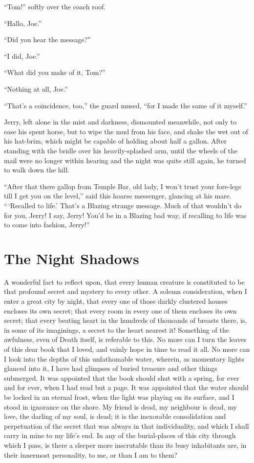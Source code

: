 ``Tom!'' softly over the coach roof.

``Hallo, Joe.''

``Did you hear the message?''

``I did, Joe.''

``What did you make of it, Tom?''

``Nothing at all, Joe.''

``That's a coincidence, too,'' the guard mused, ``for I made the
same of it myself.''

Jerry, left alone in the mist and darkness, dismounted meanwhile,
not only to ease his spent horse, but to wipe the mud from his
face, and shake the wet out of his hat-brim, which might be
capable of holding about half a gallon.  After standing with the
bridle over his heavily-splashed arm, until the wheels of the
mail were no longer within hearing and the night was quite still
again, he turned to walk down the hill.

``After that there gallop from Temple Bar, old lady, I won't trust
your fore-legs till I get you on the level,'' said this hoarse
messenger, glancing at his mare.  ``\,`Recalled to life.' That's a
Blazing strange message.  Much of that wouldn't do for you, Jerry!
I say, Jerry!  You'd be in a Blazing bad way, if recalling to life was
to come into fashion, Jerry!''



\chapter{The Night Shadows}


A wonderful fact to reflect upon, that every human creature is
constituted to be that profound secret and mystery to every other.
A solemn consideration, when I enter a great city by night, that
every one of those darkly clustered houses encloses its own secret;
that every room in every one of them encloses its own secret; that
every beating heart in the hundreds of thousands of breasts there,
is, in some of its imaginings, a secret to the heart nearest it!
Something of the awfulness, even of Death itself, is referable to
this.  No more can I turn the leaves of this dear book that I loved,
and vainly hope in time to read it all.  No more can I look into the
depths of this unfathomable water, wherein, as momentary lights
glanced into it, I have had glimpses of buried treasure and other
things submerged.  It was appointed that the book should shut with
a spring, for ever and for ever, when I had read but a page.  It was
appointed that the water should be locked in an eternal frost, when
the light was playing on its surface, and I stood in ignorance on the
shore.  My friend is dead, my neighbour is dead, my love, the darling
of my soul, is dead; it is the inexorable consolidation and
perpetuation of the secret that was always in that individuality,
and which I shall carry in mine to my life's end.  In any of the
burial-places of this city through which I pass, is there a sleeper
more inscrutable than its busy inhabitants are, in their innermost
personality, to me, or than I am to them?


